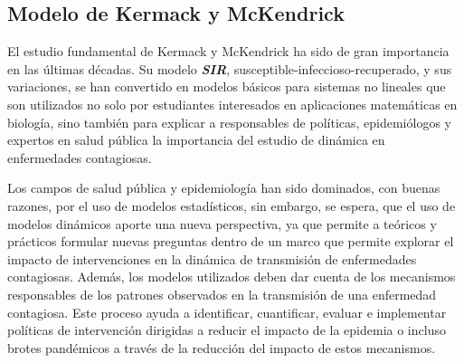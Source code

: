 \documentclass[journal]{IEEEtran}
\begin{document}
\subsection{Modelo de Kermack y McKendrick}

El estudio fundamental de Kermack \cite{Ross} y McKendrick \cite{Kermack} ha
sido de gran importancia en las últimas décadas. Su modelo
\textbf{\textit{SIR}}, susceptible-infeccioso-recuperado, y sus variaciones,
se han convertido en modelos básicos para sistemas no lineales que son
utilizados no solo por estudiantes interesados en aplicaciones matemáticas en
biología,
sino también para explicar a responsables de políticas, epidemiólogos y
expertos en salud pública la importancia del estudio de dinámica en
enfermedades contagiosas.\newline

Los campos de salud pública y epidemiología han sido dominados, con buenas
razones, por el uso de modelos estadísticos, sin embargo, se espera,
que el uso de modelos dinámicos aporte una nueva perspectiva, ya que permite a
teóricos y prácticos formular nuevas preguntas dentro de un marco que permite
explorar el impacto de intervenciones en la dinámica de transmisión de
enfermedades contagiosas.
Además, los modelos utilizados deben dar cuenta de los mecanismos responsables
de los patrones observados en la transmisión de una enfermedad contagiosa.
Este proceso ayuda a identificar, cuantificar, evaluar e implementar políticas
de intervención dirigidas a reducir el impacto de la epidemia o incluso brotes
pandémicos a través de la reducción del impacto de estos mecanismos.
\end{document}
